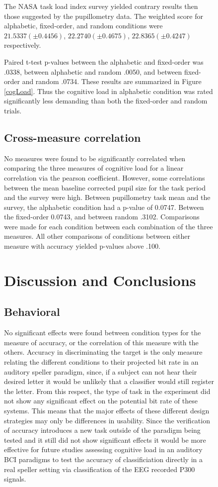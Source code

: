\documentclass[10pt]{article}
\begin{document}
\begin{figure}
The NASA task load index survey yielded contrary results then
those suggested by the pupillometry data.  
The weighted score for alphabetic, fixed-order, and random
conditions were 
$21.5337 (\pm 0.4456)$, $22.2740 (\pm 0.4675)$, $22.8365 (\pm
0.4247)$ respectively.

Paired t-test p-values between the alphabetic and fixed-order was
.0338, between alphabetic and random .0050, and between fixed-order
and random .0734.  These results are summarized in Figure
\ref{cogLoad}.  Thus the cognitive load in alphabetic condition was
rated significantly less demanding than both the fixed-order and
random trials.

\subsection{ Cross-measure correlation}
No measures were found to
be significantly correlated when comparing the three measures of cognitive load for a linear correlation via the pearson coefficient. However, some correlations between the
mean baseline corrected pupil size for the task period and the survey were high.
Between pupillometry task mean and the survey, the alphabetic condition had a p-value
of 0.0747.  Between the fixed-order 0.0743, and between random
.3102.
Comparisons were made for each condition
between each combination of the three measures.  All other
comparisons of conditions between either measure with accuracy yielded
p-values above .100.

\section{Discussion and Conclusions}

\subsection{Behavioral}

No significant effects were found between condition types for
the measure of accuracy, or the correlation of this measure
with the others.  Accuracy in discriminating the target is the
only measure relating the different conditions to their
projected bit rate in an auditory speller paradigm, since, if
a subject can not hear their desired letter it would be
unlikely that a classifier would still register the letter.
From this respect, the type of task in the experiment did not
show any significant effect on the potential bit rate of these
systems. This means that the major effects of these different
design strategies may only be differences in usability. Since
the verification of accuracy introduces a new task outside of
the paradigm being tested and it still did not show
significant effects it would be more effective for future
studies assessing cognitive load in an auditory BCI paradigms
to test the accuracy of classificiation directly in a real
speller setting via classification of the EEG recorded P300
signals.


\end{figure}
\end{document}
